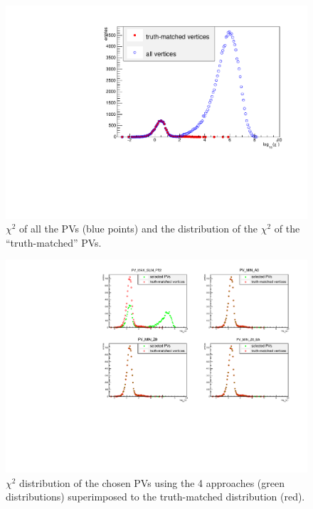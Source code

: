 \begin{figure}[h]
  \centering
  \includegraphics[width=15cm]{figures/InternalNote_Preselection/chi2DistAndMatched.pdf}
  \caption{$\chi^2$ of all the PVs (blue points) and the distribution of the $\chi^2$ of the “truth-matched” PVs.}
  \label{fig:Chi2DistAndMatched}
\end{figure}

\begin{figure}[h]
  \centering
  \includegraphics[width=15cm]{figures/InternalNote_Preselection/selectedChi2AndMatched.pdf}
  \caption{$\chi^2$ distribution of the chosen PVs using the 4 approaches (green distributions) superimposed to the truth-matched distribution (red).}
  \label{fig:selectedChi2AndMatched}
\end{figure}

